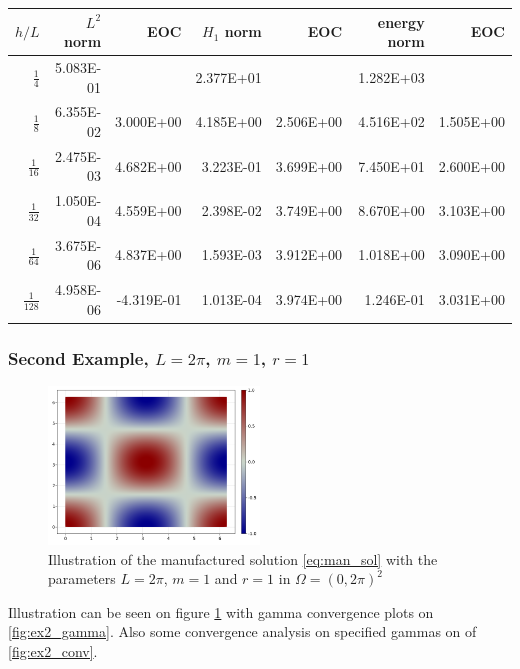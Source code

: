\begin{table}
  \begin{tabular}{rrrrrrr}
    \hline\hline
    \textbf{$h/{L} $} & \textbf{$L^2$ norm} & \textbf{EOC} & \textbf{$H_1$ norm} & \textbf{EOC} & \textbf{energy norm} & \textbf{EOC} \\\hline
    $\frac{1}{4}$ & 5.083E-01 &  & 2.377E+01 &  & 1.282E+03 &  \\
    $\frac{1}{8}$ & 6.355E-02 & 3.000E+00 & 4.185E+00 & 2.506E+00 & 4.516E+02 & 1.505E+00 \\
    $\frac{1}{16}$ & 2.475E-03 & 4.682E+00 & 3.223E-01 & 3.699E+00 & 7.450E+01 & 2.600E+00 \\
    $\frac{1}{32}$ & 1.050E-04 & 4.559E+00 & 2.398E-02 & 3.749E+00 & 8.670E+00 & 3.103E+00 \\
    $\frac{1}{64}$ & 3.675E-06 & 4.837E+00 & 1.593E-03 & 3.912E+00 & 1.018E+00 & 3.090E+00 \\
    $\frac{1}{128}$ & 4.958E-06 & -4.319E-01 & 1.013E-04 & 3.974E+00 & 1.246E-01 & 3.031E+00 \\\hline\hline
  \end{tabular}
\end{table}


\subsubsection{Second Example, $L=2 \pi $, $m=1$, $r=1$}%
\label{sub:first_example}

\begin{figure}[tbh!]
    \centering
    \includegraphics[width=0.5\textwidth]{figures/model/l_6.28_m_1_r_1n_100_sol.png}
    \caption{Illustration of the manufactured solution \eqref{eq:man_sol}   with the parameters $L=2\pi$, $m=1$ and $r=1$ in $\Omega = (0,2\pi)^2$}
    \label{fig:sol_l2pi_m1_r1}
\end{figure}

Illustration can be seen on figure \ref{fig:sol_l2pi_m1_r1} with gamma convergence plots on \ref{fig:ex2_gamma}. Also some convergence analysis on specified gammas on of \ref{fig:ex2_conv}.

